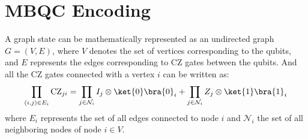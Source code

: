 \documentclass[reprint, amsmath,amssymb, aps,pra,
 floatfix,
]{revtex4-2}
\begin{document}
\section{MBQC Encoding }
\label{APPENDIX: MBQC min distance}
\noindent A  graph state can be mathematically represented as an undirected graph $G = (V, E)$, where $V$  denotes the set of vertices corresponding to the qubits, and $ E$  represents the edges corresponding to $\mathrm{CZ}$ gates between the qubits.
And all the $\mathrm{CZ}$ gates connected with a vertex $i$ can be written as:
\begin{equation}
    \prod_{(i,j)\in E_i}\mathrm{CZ}_{ji} = \prod_{j\in \mathcal{N}_i} I_j \otimes \ket{0}\bra{0}_i + \prod_{j\in \mathcal{N}_i}Z_j\otimes \ket{1}\bra{1}_i
    \label{cz equation}
\end{equation}
where $E_i$ represents the set of all edges connected to node $i$ and $\mathcal{N}_i$ the set of all neighboring nodes of node $ i \in V$.
\end{document}
